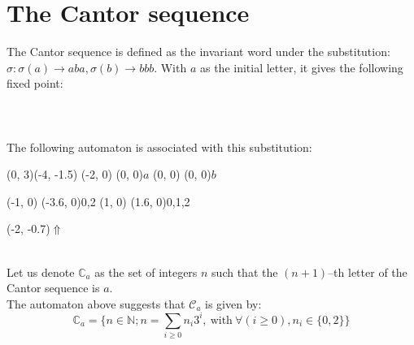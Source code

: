 \documentclass{article}
\begin{document}
\section*{The Cantor sequence}
The Cantor sequence is defined as the invariant word under the substitution: 
$\sigma: \sigma(a) \rightarrow aba, \sigma(b) \rightarrow bbb$. With $a$ as the
initial letter, it gives the following fixed point:\\
\\
\\
\\
The following automaton is associated with this
substitution:\\
\begin{graph}(0, 3)(-4, -1.5)
  (-2, 0) (0, 0){$a$}
  (0, 0)  (0, 0){$b$}

  (-1, 0) \freetext(-3.6, 0){0,2}
   
  (1, 0) \freetext(1.6, 0){0,1,2}

  \freetext(-2, -0.7){$\Uparrow$}
\end{graph}\\
Let us denote $\mathbb{C}_a$ as the set of integers $n$ such that the
$(n + 1)$--th letter of the Cantor sequence is $a$.\\
The automaton above suggests that $\mathcal{C}_a$ is given by:
\begin{displaymath}
  \mathbb{C}_a = \Big\{n \in \mathbb{N}; n = \sum_{i \ge 0} n_i3^i,
  \mathrm{\ with\ } \forall(i \ge 0), n_i \in \{0, 2\}\Big\}
\end{displaymath}
\end{document}

